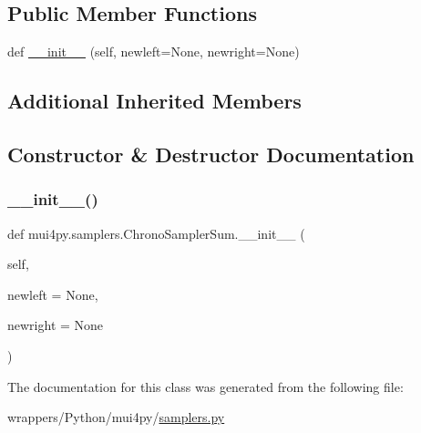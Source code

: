 \subsection*{Public Member Functions}
\begin{DoxyCompactItemize}
\item 
def \hyperlink{classmui4py_1_1samplers_1_1_chrono_sampler_sum_af32532e7ecd727bb05f3e3390cb8c1f5}{\+\_\+\+\_\+init\+\_\+\+\_\+} (self, newleft=None, newright=None)
\end{DoxyCompactItemize}
\subsection*{Additional Inherited Members}


\subsection{Constructor \& Destructor Documentation}
\mbox{\label{classmui4py_1_1samplers_1_1_chrono_sampler_sum_af32532e7ecd727bb05f3e3390cb8c1f5}} 
\subsubsection{\texorpdfstring{\+\_\+\+\_\+init\+\_\+\+\_\+()}{\_\_init\_\_()}}
{\footnotesize\ttfamily def mui4py.\+samplers.\+Chrono\+Sampler\+Sum.\+\_\+\+\_\+init\+\_\+\+\_\+ (\begin{DoxyParamCaption}\item[{}]{self,  }\item[{}]{newleft = {\ttfamily None},  }\item[{}]{newright = {\ttfamily None} }\end{DoxyParamCaption})}



The documentation for this class was generated from the following file\+:\begin{DoxyCompactItemize}
\item 
wrappers/\+Python/mui4py/\hyperlink{samplers_8py}{samplers.\+py}\end{DoxyCompactItemize}
